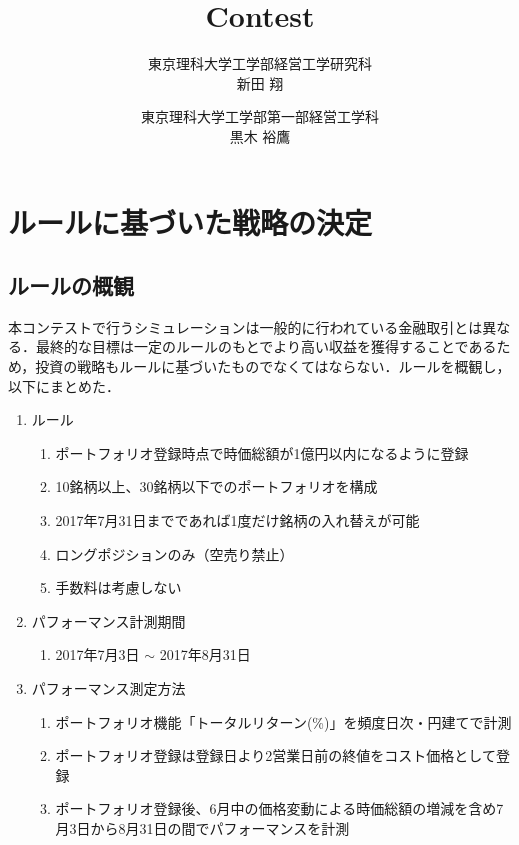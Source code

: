 \documentclass[11pt]{jreport}
\begin{document}
\title{Contest\\}
\author{東京理科大学工学部経営工学研究科\\新田 翔 \and 東京理科大学工学部第一部経営工学科\\黒木 裕鷹}
\maketitle
\begin{abstract}

\end{abstract}


\chapter{ルールに基づいた戦略の決定}
\section{ルールの概観}

本コンテストで行うシミュレーションは一般的に行われている金融取引とは異なる．最終的な目標は一定のルールのもとでより高い収益を獲得することであるため，投資の戦略もルールに基づいたものでなくてはならない．ルールを概観し，以下にまとめた．

\begin{enumerate}
\item ルール
\begin{enumerate}
\item ポートフォリオ登録時点で時価総額が1億円以内になるように登録
\item 10銘柄以上、30銘柄以下でのポートフォリオを構成
\item 2017年7月31日までであれば1度だけ銘柄の入れ替えが可能
\item ロングポジションのみ（空売り禁止）
\item 手数料は考慮しない
\end{enumerate}

\item パフォーマンス計測期間
\begin{enumerate}
\item  2017年7月3日 $\sim$ 2017年8月31日
\end{enumerate}

\item パフォーマンス測定方法
\begin{enumerate}
\item ポートフォリオ機能「トータルリターン(\%)」を頻度日次・円建てで計測
\item ポートフォリオ登録は登録日より2営業日前の終値をコスト価格として登録
\item ポートフォリオ登録後、6月中の価格変動による時価総額の増減を含め7月3日から8月31日の間でパフォーマンスを計測
\end{enumerate}
\end{enumerate}
\end{document}
